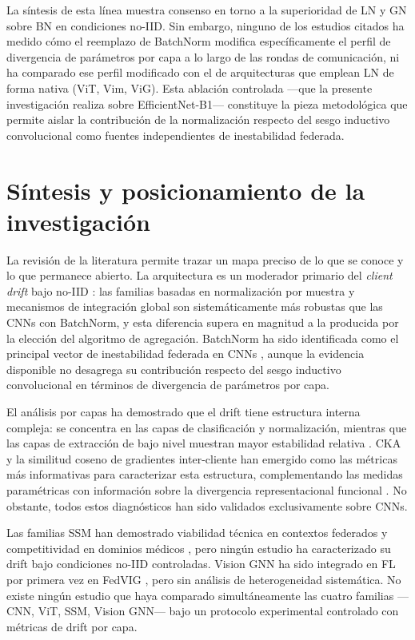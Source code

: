 La síntesis de esta línea muestra consenso en torno a la superioridad de LN y GN sobre BN en
condiciones no-IID.
Sin embargo, ninguno de los estudios citados ha medido cómo el reemplazo de BatchNorm modifica
específicamente el perfil de divergencia de parámetros por capa a lo largo de las rondas de
comunicación, ni ha comparado ese perfil modificado con el de arquitecturas que emplean LN de
forma nativa (ViT, Vim, ViG).
Esta ablación controlada ---que la presente investigación realiza sobre EfficientNet-B1---
constituye la pieza metodológica que permite aislar la contribución de la normalización respecto
del sesgo inductivo convolucional como fuentes independientes de inestabilidad federada.


\section{Síntesis y posicionamiento de la investigación}

La revisión de la literatura permite trazar un mapa preciso de lo que se conoce y lo que permanece
abierto.
La arquitectura es un moderador primario del \textit{client drift} bajo no-IID
\cite{qu2022rethinking, pieri2023handlingdataheterogeneityarchitectural, buyuktacs2024transformer}:
las familias basadas en normalización por muestra y mecanismos de integración global son
sistemáticamente más robustas que las CNNs con BatchNorm, y esta diferencia supera en magnitud a
la producida por la elección del algoritmo de agregación.
BatchNorm ha sido identificada como el principal vector de inestabilidad federada en CNNs
\cite{wang2023batch, du2022rethinking, xu2023fedconv, siomos2024architecture}, aunque la evidencia
disponible no desagrega su contribución respecto del sesgo inductivo convolucional en términos de
divergencia de parámetros por capa.

El análisis por capas ha demostrado que el drift tiene estructura interna compleja: se concentra
en las capas de clasificación y normalización, mientras que las capas de extracción de bajo nivel
muestran mayor estabilidad relativa \cite{son2022comparisons}.
CKA y la similitud coseno de gradientes inter-cliente han emergido como las métricas más
informativas para caracterizar esta estructura, complementando las medidas paramétricas con
información sobre la divergencia representacional funcional
\cite{DBLP:journals/corr/abs-1905-00414, son2022comparisons}.
No obstante, todos estos diagnósticos han sido validados exclusivamente sobre CNNs.

Las familias SSM han demostrado viabilidad técnica en contextos federados \cite{wu2024mamba} y
competitividad en dominios médicos \cite{yue2024medmamba}, pero ningún estudio ha caracterizado
su drift bajo condiciones no-IID controladas.
Vision GNN ha sido integrado en FL por primera vez en FedVIG \cite{cui2025fedvig}, pero sin
análisis de heterogeneidad sistemática.
No existe ningún estudio que haya comparado simultáneamente las cuatro familias ---CNN, ViT, SSM,
Vision GNN--- bajo un protocolo experimental controlado con métricas de drift por capa.


